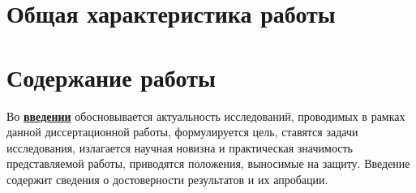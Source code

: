 \section*{Общая характеристика работы}

\newcommand{\actuality}{\pdfbookmark[1]{Актуальность и степень разработанности темы исследования}{actuality}\textbf{\uline{\actualityTXT}}}
\newcommand{\progress}{\pdfbookmark[1]{Разработанность темы}{progress}\underline{\textbf{\progressTXT}}}
\newcommand{\aim}{\pdfbookmark[1]{Цели}{aim}\underline{{\textbf\aimTXT}}}
\newcommand{\tasks}{\pdfbookmark[1]{Задачи}{tasks}\underline{\textbf{\tasksTXT}}}
\newcommand{\aimtasks}{\pdfbookmark[1]{Цели и задачи}{aimtasks}\aimtasksTXT}
\newcommand{\novelty}{\pdfbookmark[1]{Научная новизна}{novelty}\underline{\textbf{\noveltyTXT}}}
\newcommand{\influence}{\pdfbookmark[1]{Практическая значимость}{influence}\underline{\textbf{\influenceTXT}}}
\newcommand{\methods}{\pdfbookmark[1]{Методология и методы исследования}{methods}\underline{\textbf{\methodsTXT}}}
\newcommand{\defpositions}{\pdfbookmark[1]{Положения, выносимые на защиту}{defpositions}\underline{\textbf{\defpositionsTXT}}}
\newcommand{\reliability}{\pdfbookmark[1]{Достоверность}{reliability}\underline{\textbf{\reliabilityTXT}}}
\newcommand{\probation}{\pdfbookmark[1]{Апробация}{probation}\underline{\textbf{\probationTXT}}}
\newcommand{\contribution}{\pdfbookmark[1]{Личный вклад}{contribution}\underline{\textbf{\contributionTXT}}}
\newcommand{\publications}{\pdfbookmark[1]{Публикации}{publications}\underline{\textbf{\publicationsTXT}}}




\section*{Содержание работы}
Во \underline{\textbf{введении}} обосновывается актуальность исследований, проводимых в рамках данной диссертационной работы, формулируется цель, ставятся задачи исследования, излагается научная новизна и практическая значимость представляемой работы, приводятся положения, выносимые на защиту. Введение содержит сведения о достоверности результатов и их апробации.

